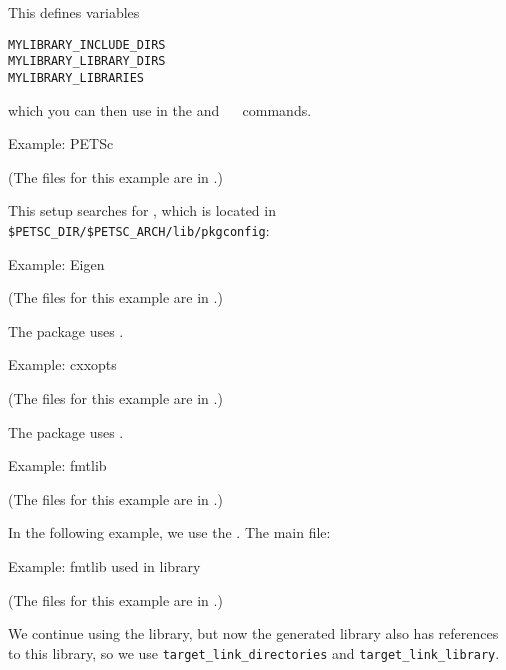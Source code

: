 This defines variables
\begin{verbatim}
MYLIBRARY_INCLUDE_DIRS
MYLIBRARY_LIBRARY_DIRS
MYLIBRARY_LIBRARIES
\end{verbatim}
which you can then use in the
and
~\
commands.

 {Example: PETSc}

(The files for this example are in .)

This  setup searches for ,
which is located in \verb+$PETSC_DIR/$PETSC_ARCH/lib/pkgconfig+:
%



 {Example: Eigen}

(The files for this example are in .)

The  package uses .




 {Example: cxxopts}

(The files for this example are in .)

The  package uses .




 {Example: fmtlib}

(The files for this example are in .)

In the following example, we use the .
The main  file:
%


 {Example: fmtlib used in library}

(The files for this example are in .)

We continue using the  library,
but now the generated library also has references to this library,
so we use \lstinline+target_link_directories+ and \lstinline+target_link_library+.

